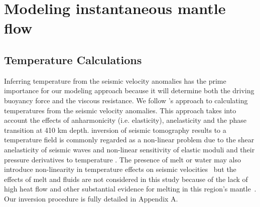 \documentclass[draft,linenumbers]{agujournal2018}
\begin{document}
\section{Modeling instantaneous mantle flow}
    
\subsection{Temperature Calculations} \label{temp_var}
    Inferring temperature from the seismic velocity anomalies has the prime importance for our modeling approach because it will determine both the driving buoyancy force and the viscous resistance. We follow \citet{Cammarano2003}'s approach to calculating temperatures from the seismic velocity anomalies. This approach takes into account the effects of anharmonicity (i.e. elasticity), anelasticity and the phase transition at 410 km depth. inversion of seismic tomography results to a temperature field is commonly regarded as a non-linear problem due to the shear anelasticity of seismic waves \citep{minster1981model, karato1993importance, sobolev1996upper, Goes_2000, artemieva2004shear} and non-linear sensitivity of elastic moduli and their pressure derivatives to temperature \citep{duffy1989seismic, anderson1992high, Cammarano2003, stixrude2005thermodynamics}. The presence of melt or water may also introduce non-linearity in temperature effects on seismic velocities~\citep{Karato_1998} but the effects of melt and fluids are not considered in this study because of the lack of high heat flow and other substantial evidence for melting in this region's mantle~\citep{blackwell2006assessment}. Our inversion procedure is fully detailed in Appendix A.
%
    
\end{document}
